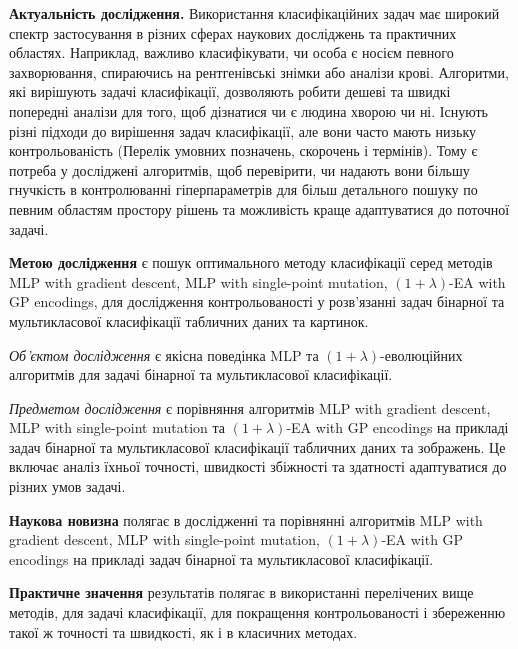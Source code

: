 \textbf{Актуальність дослідження.} Використання класифікаційних задач має широкий спектр застосування в різних сферах наукових досліджень та практичних областях. Наприклад, важливо класифікувати, чи особа є носієм певного захворювання, спираючись на рентгенівські знімки або аналізи крові. Алгоритми, які вирішують задачі класифікації, дозволяють робити дешеві та швидкі попередні аналізи для того, щоб дізнатися чи є людина хворою чи ні. Існують різні підходи до вирішення задач класифікації, але вони часто мають низьку контрольованість (Перелік умовних позначень, скорочень і термінів). Тому є потреба у досліджені алгоритмів, щоб перевірити, чи надають вони більшу гнучкість в контролюванні гіперпараметрів для більш детального пошуку по певним областям простору рішень та можливість краще адаптуватися до поточної задачі.

\textbf{Метою дослідження} є пошук оптимального методу класифікації серед методів MLP with gradient descent, MLP with single-point mutation, $(1+\lambda)$-EA with GP encodings, для дослідження контрольованості у розв'язанні задач бінарної та мультикласової класифікації табличних даних та картинок.

\emph{Об'єктом дослідження} є якісна поведінка MLP та $(1+\lambda)$-еволюційних алгоритмів для задачі бінарної та мультикласової класифікації.

\emph{Предметом дослідження} є порівняння алгоритмів MLP with gradient descent, MLP with single-point mutation та $(1+\lambda)$-EA with GP encodings на прикладі задач бінарної та мультикласової класифікації табличних даних та зображень. Це включає аналіз їхньої точності, швидкості збіжності та здатності адаптуватися до різних умов задачі.

\textbf{Наукова новизна} полягає в дослідженні та порівнянні алгоритмів MLP with gradient descent, MLP with single-point mutation, $(1+\lambda)$-EA with GP encodings на прикладі задач бінарної та мультикласової класифікації.

\textbf{Практичне значення} результатів полягає в використанні перелічених вище методів, для задачі класифікації, для покращення контрольованості і збереженню такої ж точності та швидкості, як і в класичних методах.